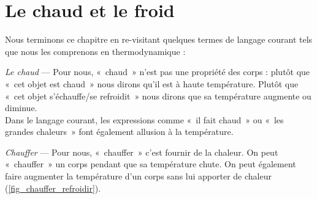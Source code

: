 \section{Le chaud et le froid}

	Nous terminons ce chapitre en re-visitant quelques termes de langage courant tels que nous les comprenons en thermodynamique :

		\begin{description}

			\item \textit{Le chaud} --- Pour nous, «~chaud~» n’est pas une propriété des corps : plutôt que «~cet objet est chaud~» nous dirons qu’il est à haute température. Plutôt que «~cet objet s’échauffe/se refroidit~» nous dirons que sa température augmente ou diminue.\\
				Dans le langage courant, les expressions comme «~il fait chaud~» ou «~les grandes chaleurs~» font également allusion à la température.
			
			\item \textit{Chauffer} --- Pour nous, «~chauffer~» c’est fournir de la chaleur. On peut «~chauffer~» un corps pendant que sa température chute. On peut également faire augmenter la température d’un corps sans lui apporter de chaleur (\cref{fig_chauffer_refroidir}).


\end{description}
